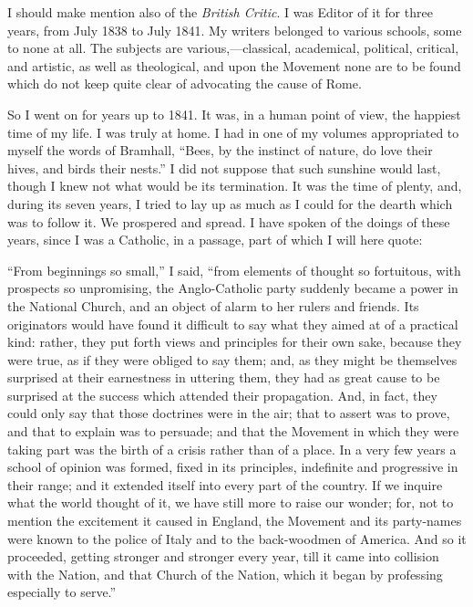 I should make mention also of the \emph{British Critic}. I was Editor of it
for three years, from July 1838 to July 1841. My writers belonged to
various schools, some to none at all. The subjects are various,—classical,
academical, political, critical, and artistic, as well as theological,
and upon the Movement none are to be found which do not keep quite clear
of advocating the cause of Rome.

So I went on for years up to 1841. It was, in a human point of view,
the happiest time of my life. I was truly at home. I had in one of my
volumes appropriated to myself the words of Bramhall, ``Bees, by the
instinct of nature, do love their hives, and birds their nests.'' I
did not suppose that such sunshine would last, though I knew not what
would be its termination. It was the time of plenty, and, during its
seven years, I tried to lay up as much as I could for the dearth which
was to follow it. We prospered and spread. I have spoken of the doings
of these years, since I was a Catholic, in a passage, part of which I
will here quote:

``From beginnings so small,'' I said, ``from elements of
thought so fortuitous, with prospects so unpromising, the Anglo-Catholic
party suddenly became a power in the National Church, and an object of
alarm to her rulers and friends. Its originators would have found
it difficult to say what they aimed at of a practical kind: rather, they
put forth views and principles for their own sake, because they were
true, as if they were obliged to say them; and, as they might be
themselves surprised at their earnestness in uttering them, they had as
great cause to be surprised at the success which attended their
propagation. And, in fact, they could only say that those doctrines were
in the air; that to assert was to prove, and that to explain was to
persuade; and that the Movement in which they were taking part was the
birth of a crisis rather than of a place. In a very few years a school
of opinion was formed, fixed in its principles, indefinite and
progressive in their range; and it extended itself into every part of
the country. If we inquire what the world thought of it, we have still
more to raise our wonder; for, not to mention the excitement it caused
in England, the Movement and its party-names were known to the police of
Italy and to the back-woodmen of America. And so it proceeded, getting
stronger and stronger every year, till it came into collision with the
Nation, and that Church of the Nation, which it began by professing
especially to serve.''


